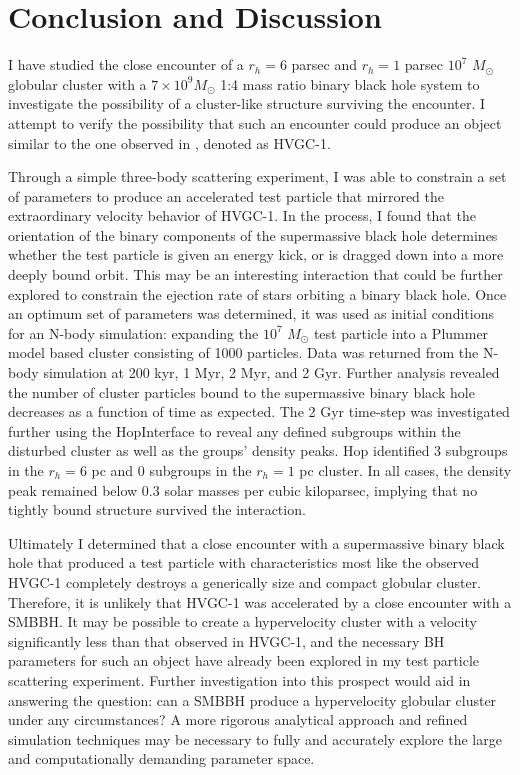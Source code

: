 \documentclass{aastex62}
\begin{document}
\section{Conclusion and Discussion}
I have studied the close encounter of a $r_{h} = 6$ parsec and $r_{h} = 1$ parsec $10^7$ $M_{\odot}$ globular cluster with a $7\times10^9 M_{\odot}$ 1:4 mass ratio binary black hole system to investigate the possibility of a cluster-like structure surviving the encounter. I attempt to verify the possibility that such an encounter could produce an object similar to the one observed in \citet{cald14}, denoted as HVGC-1. 

Through a simple three-body scattering experiment, I was able to constrain a set of parameters to produce an accelerated test particle that mirrored the extraordinary velocity behavior of HVGC-1. In the process, I found that the orientation of the binary components of the supermassive black hole determines whether the test particle is given an energy kick, or is dragged down into a more deeply bound orbit. This may be an interesting interaction that could be further explored to constrain the ejection rate of stars orbiting a binary black hole. Once an optimum set of parameters was determined, it was used as initial conditions for an N-body simulation: expanding the $10^7$ $M_{\odot}$ test particle into a Plummer model based cluster consisting of 1000 particles. Data was returned from the N-body simulation at 200 kyr, 1 Myr, 2 Myr, and 2 Gyr. Further analysis revealed the number of cluster particles bound to the supermassive binary black hole decreases as a function of time as expected. The 2 Gyr time-step was investigated further using the HopInterface to reveal any defined subgroups within the disturbed cluster as well as the groups' density peaks. Hop identified 3 subgroups in the $r_{h} = 6$ pc and 0 subgroups in the $r_{h} = 1$ pc cluster. In all cases, the density peak remained below $0.3$ solar masses per cubic kiloparsec, implying that no tightly bound structure survived the interaction. 

Ultimately I determined that a close encounter with a supermassive binary black hole that produced a test particle with characteristics most like the observed HVGC-1 completely destroys a generically size and compact globular cluster. Therefore, it is unlikely that HVGC-1 was accelerated by a close encounter with a SMBBH. It may be possible to create a hypervelocity cluster with a velocity significantly less than that observed in HVGC-1, and the necessary BH parameters for such an object have already been explored in my test particle scattering experiment. Further investigation into this prospect would aid in answering the question: can a SMBBH produce a hypervelocity globular cluster under any circumstances? A more rigorous analytical approach and refined simulation techniques may be necessary to fully and accurately explore the large and computationally demanding parameter space.
\end{document}
